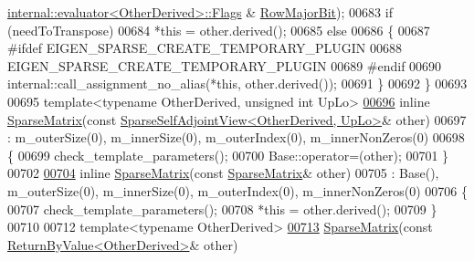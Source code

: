 \begin{DoxyCode}
      \hyperlink{struct_eigen_1_1internal_1_1evaluator}{internal::evaluator<OtherDerived>::Flags} & 
      \hyperlink{group__flags_gae4f56c2a60bbe4bd2e44c5b19cbe8762}{RowMajorBit});
00683       \textcolor{keywordflow}{if} (needToTranspose)
00684         *\textcolor{keyword}{this} = other.derived();
00685       \textcolor{keywordflow}{else}
00686       \{
00687 \textcolor{preprocessor}{        #ifdef EIGEN\_SPARSE\_CREATE\_TEMPORARY\_PLUGIN}
00688           EIGEN\_SPARSE\_CREATE\_TEMPORARY\_PLUGIN
00689 \textcolor{preprocessor}{        #endif}
00690         internal::call\_assignment\_no\_alias(*\textcolor{keyword}{this}, other.derived());
00691       \}
00692     \}
00693     
00695     \textcolor{keyword}{template}<\textcolor{keyword}{typename} OtherDerived, \textcolor{keywordtype}{unsigned} \textcolor{keywordtype}{int} UpLo>
\hyperlink{group___sparse_core___module_aa755e8ba4ec4a2e39ebdb658228364e5}{00696}     \textcolor{keyword}{inline} \hyperlink{group___sparse_core___module_aa755e8ba4ec4a2e39ebdb658228364e5}{SparseMatrix}(\textcolor{keyword}{const} 
      \hyperlink{group___sparse_core___module_class_eigen_1_1_sparse_self_adjoint_view}{SparseSelfAdjointView<OtherDerived, UpLo>}& other)
00697       : m\_outerSize(0), m\_innerSize(0), m\_outerIndex(0), m\_innerNonZeros(0)
00698     \{
00699       check\_template\_parameters();
00700       Base::operator=(other);
00701     \}
00702 
\hyperlink{group___sparse_core___module_af0fa64cdba1f30353aac937a31db33f3}{00704}     \textcolor{keyword}{inline} \hyperlink{group___sparse_core___module_af0fa64cdba1f30353aac937a31db33f3}{SparseMatrix}(\textcolor{keyword}{const} \hyperlink{group___sparse_core___module_class_eigen_1_1_sparse_matrix}{SparseMatrix}& other)
00705       : Base(), m\_outerSize(0), m\_innerSize(0), m\_outerIndex(0), m\_innerNonZeros(0)
00706     \{
00707       check\_template\_parameters();
00708       *\textcolor{keyword}{this} = other.derived();
00709     \}
00710 
00712     \textcolor{keyword}{template}<\textcolor{keyword}{typename} OtherDerived>
\hyperlink{group___sparse_core___module_a4e328e4686980219c2b4d2a932670ab0}{00713}     \hyperlink{group___sparse_core___module_a4e328e4686980219c2b4d2a932670ab0}{SparseMatrix}(\textcolor{keyword}{const} \hyperlink{group___core___module_class_eigen_1_1_return_by_value}{ReturnByValue<OtherDerived>}& other)

\end{DoxyCode}
